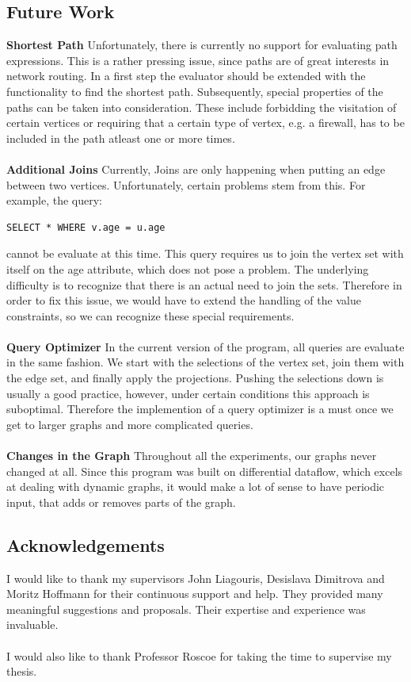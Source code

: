 \documentclass[11pt,singlecolumn]{scrartcl}
\begin{document}
\subsection{Future Work}
\textbf{Shortest Path} \quad Unfortunately, there is currently no support for evaluating path expressions. This is a rather pressing issue, since paths are of great interests in network routing. In a first step the evaluator should be extended with the functionality to find the shortest path. Subsequently, special properties of the paths can be taken into consideration. These include forbidding the visitation of certain vertices or requiring that a certain type of vertex, e.g. a firewall, has to be included in the path atleast one or more times.\\\\
\textbf{Additional Joins} \quad Currently, Joins are only happening when putting an edge between two vertices. Unfortunately, certain problems stem from this. For example, the query: \begin{verbatim}SELECT * WHERE v.age = u.age\end{verbatim} cannot be evaluate at this time. This query requires us to join the vertex set with itself on the age attribute, which does not pose a problem. The underlying difficulty is to recognize that there is an actual need to join the sets. Therefore in order to fix this issue, we would have to extend the handling of the value constraints, so we can recognize these special requirements. \\\\
\textbf{Query Optimizer} \quad In the current version of the program, all queries are evaluate in the same fashion. We start with the selections of the vertex set, join them with the edge set, and finally apply the projections. Pushing the selections down is usually a good practice, however, under certain conditions this approach is suboptimal. Therefore the implemention of a query optimizer is a must once we get to larger graphs and more complicated queries.\\\\
\textbf{Changes in the Graph} \quad Throughout all the experiments, our graphs never changed at all. Since this program was built on differential dataflow, which excels at dealing with dynamic graphs, it would make a lot of sense to have periodic input, that adds or removes parts of the graph.
\subsection{Acknowledgements}
I would like to thank my supervisors John Liagouris, Desislava Dimitrova and Moritz Hoffmann for their continuous support and help. They provided many meaningful suggestions and proposals. Their expertise and experience was invaluable.\\\\
I would also like to thank Professor Roscoe for taking the time to supervise my thesis.

\clearpage


{}

\end{document}
